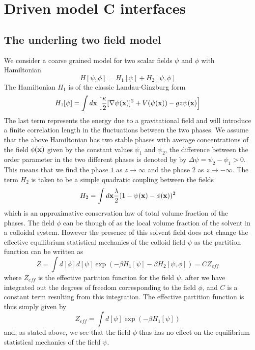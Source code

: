     \section{Driven model C interfaces}

    \subsection{The underling two field  model}

We consider a coarse grained model for two scalar fields $\psi$ and $\phi$ with Hamiltonian
\begin{equation}
    H[\psi,\phi] = H_1[\psi] +H_2[\psi,\phi]
\end{equation}
The Hamiltonian $H_1$ is of the classic Landau-Ginzburg form
\begin{equation}
    H_1[\psi]=\int d{\bf x}\left[\frac{\kappa}{2}[\nabla\psi({\bf x})]^2 + V(\psi({\bf x}))
- gz \psi({\bf x})\right]
\end{equation}
The last term represents the energy due to a gravitational field and will introduce a finite correlation length in the fluctuations between the two phases. We assume that the above Hamiltonian has two stable phases with average concentrations of the field $\phi({\bf x})$ given by the constant values $\psi_1$ and $\psi_2$, the difference between the order parameter in  the two different phases is denoted by 
by $\Delta\psi= \psi_2 -\psi_1 \greater 0$. This means that we find the phase $1$ as $z\to\infty$ and the phase $2$ as $z\to-\infty$. The term $H_2$ is taken to be a simple quadratic coupling between the fields
\begin{equation}
    H_2 =\int d{\bf x} \frac{\lambda}{2}(1-\psi({\bf x})-\phi({\bf x}))^2
\end{equation}
which is an approximative conservation law of total volume fraction of the phases. The field $\phi$ can be though of as the local volume fraction of the solvent in a colloidal system. However the presence of this solvent field does not change the effective equilibrium statistical mechanics of the colloid field $\psi$ as the partition function can be written as 
\begin{equation}
    Z = \int d[\phi]d[\psi]\exp(-\beta H_1[\psi]- \beta H_2[\psi,\phi]) = CZ_{eff}
\end{equation}
where $Z_{eff}$ is the effective partition function for the field $\psi$, after we have integrated out the degrees of freedom corresponding to the field $\phi$,
and $C$ is a constant term resulting from this integration. The effective partition function is thus simply given by
\begin{equation}
    Z_{eff} = \int d[\psi]\exp(-\beta H_1[\psi])
\end{equation}
and, as stated above, we see that the field $\phi$ thus has no effect on the equilibrium statistical mechanics of the field $\psi$.

